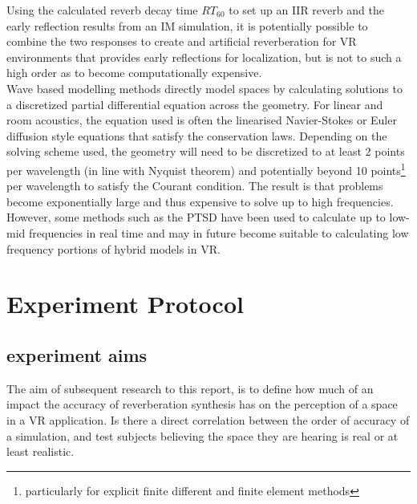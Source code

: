 \documentclass[paper=a4, fontsize=10pt, font=arial]{scrartcl} %
\numberwithin{equation}{section} %
\numberwithin{figure}{section} %
\numberwithin{table}{section} %
\begin{document}
Using the calculated reverb decay time $RT_{60}$ to set up an IIR reverb and the early reflection results from an IM simulation, it is potentially possible to combine the two responses to create and artificial reverberation for VR environments that provides early reflections for localization, but is not to such a high order as to become computationally expensive. \\

Wave based modelling methods directly model spaces by calculating solutions to a discretized partial differential equation across the geometry. For linear and room acoustics, the equation used is often the linearised Navier-Stokes or Euler diffusion style equations that satisfy the conservation laws. Depending on the solving scheme used, the geometry will need to be discretized to at least 2 points per wavelength (in line with Nyquist theorem) and potentially beyond 10 points\footnote{particularly for explicit finite different and finite element methods} per wavelength to satisfy the Courant condition. The result is that problems become exponentially large and thus expensive to solve up to high frequencies. However, some methods such as the PTSD have been used to calculate up to low-mid frequencies in real time and may in future become suitable to calculating low frequency portions of hybrid models in VR.

\newpage
\section{Experiment Protocol}
\subsection{experiment aims}
The aim of subsequent research to this report, is to define how much of an impact the accuracy of reverberation synthesis has on the perception of a space in a VR application. Is there a direct correlation between the order of accuracy of a simulation, and test subjects believing the space they are hearing is real or at least realistic. 
\end{document}
